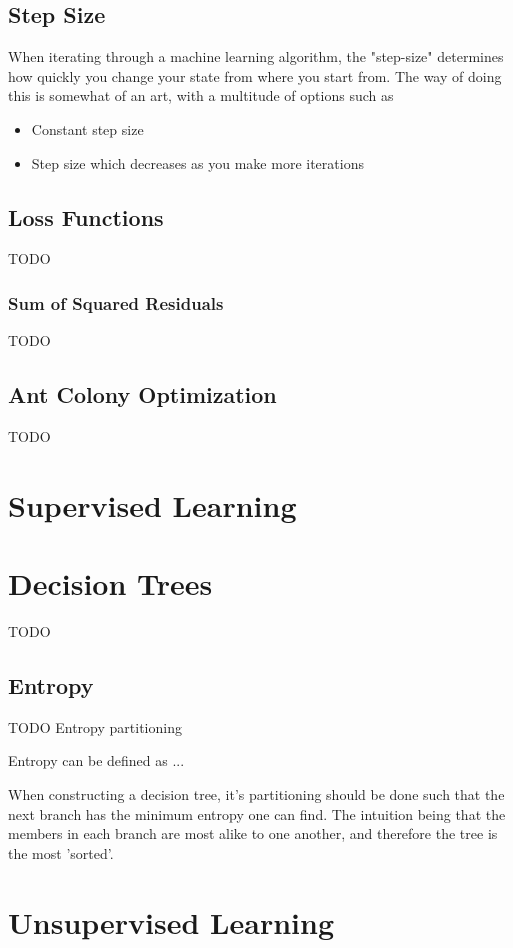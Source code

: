 \subsection{Step Size}
When iterating through a machine learning algorithm, the "step-size" determines how quickly you change your state from where you start from. The way of doing this is somewhat of an art, with a multitude of options such as 
\begin{itemize}
	\item Constant step size
	\item Step size which decreases as you make more iterations
\end{itemize}

\subsection{Loss Functions}
TODO
\subsubsection{Sum of Squared Residuals}
TODO

\subsection{Ant Colony Optimization}
TODO


\section{Supervised Learning}

\section{Decision Trees}
TODO
\subsection{Entropy}
TODO Entropy partitioning

Entropy can be defined as ...


When constructing a decision tree, it's partitioning should be done such that the next branch has the minimum entropy one can find. The intuition being that the members in each branch are most alike to one another, and therefore the tree is the most 'sorted'.

\section{Unsupervised Learning}


